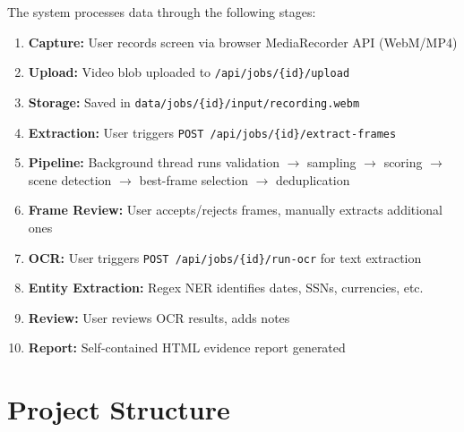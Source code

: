 \documentclass[12pt, a4paper]{article}
\newcommand{\codeinline}[1]{\texttt{\small\colorbox{codebg}{#1}}}
\begin{document}
The system processes data through the following stages:

\begin{enumerate}
    \item \textbf{Capture:} User records screen via browser MediaRecorder API (WebM/MP4)
    \item \textbf{Upload:} Video blob uploaded to \codeinline{/api/jobs/\{id\}/upload}
    \item \textbf{Storage:} Saved in \codeinline{data/jobs/\{id\}/input/recording.webm}
    \item \textbf{Extraction:} User triggers \codeinline{POST /api/jobs/\{id\}/extract-frames}
    \item \textbf{Pipeline:} Background thread runs validation $\rightarrow$ sampling $\rightarrow$ scoring $\rightarrow$ scene detection $\rightarrow$ best-frame selection $\rightarrow$ deduplication
    \item \textbf{Frame Review:} User accepts/rejects frames, manually extracts additional ones
    \item \textbf{OCR:} User triggers \codeinline{POST /api/jobs/\{id\}/run-ocr} for text extraction
    \item \textbf{Entity Extraction:} Regex NER identifies dates, SSNs, currencies, etc.
    \item \textbf{Review:} User reviews OCR results, adds notes
    \item \textbf{Report:} Self-contained HTML evidence report generated
\end{enumerate}

\section{Project Structure}
\end{document}
